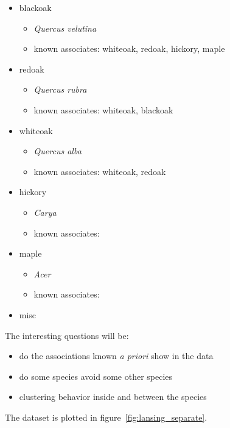 \documentclass[12pt,a4paper,oneside,article]{memoir}
\begin{document}
\begin{itemize}
  \item blackoak
  	\begin{itemize}
  	  \item \emph{Quercus velutina}
  	  \item known associates: whiteoak, redoak, hickory, maple
  	\end{itemize} 
  \item redoak
   \begin{itemize}
  	  \item \emph{Quercus rubra}
  	  \item known associates: whiteoak, blackoak
  	\end{itemize}  
  \item whiteoak
   \begin{itemize}
  	  \item \emph{Quercus alba}
  	  \item known associates: whiteoak, redoak
  	\end{itemize}    
  \item hickory
   \begin{itemize}
  	  \item \emph{Carya}
  	  \item known associates:  
  	\end{itemize}  
  \item maple
   \begin{itemize}
  	  \item \emph{Acer}
  	  \item known associates: 
  	\end{itemize}  
  \item misc 
\end{itemize}  

The interesting questions will be:
\begin{itemize}
  \item do the associations known \emph{a priori} show in the data
  \item do some species avoid some other species
  \item clustering behavior inside and between the species
\end{itemize}
The dataset is plotted in figure~\ref{fig:lansing_separate}. 


\end{document}
